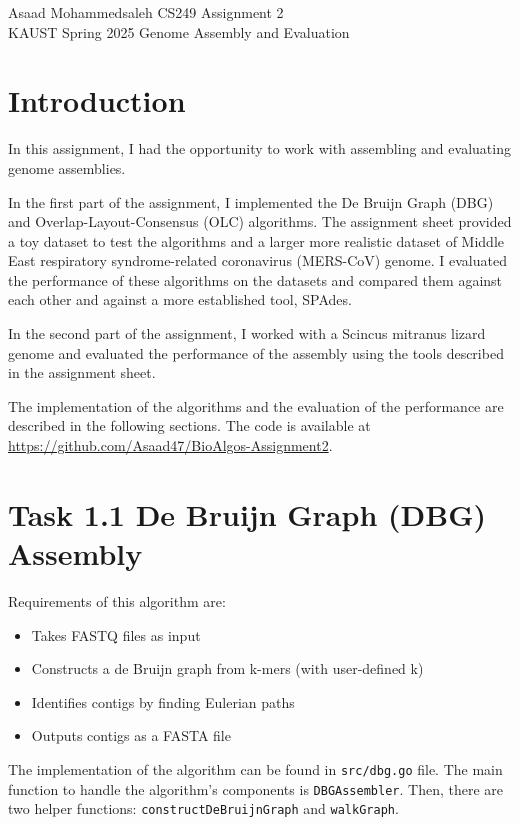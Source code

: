 \documentclass[12pt]{article}
\begin{document}
\noindent Asaad Mohammedsaleh \hfill CS249 Assignment 2\\
KAUST Spring 2025 \hfill Genome Assembly and Evaluation


\hrulefill

\section{Introduction}

In this assignment, I had the opportunity to work with assembling and evaluating genome assemblies. 

In the first part of the assignment, I implemented the De Bruijn Graph (DBG) and Overlap-Layout-Consensus (OLC) algorithms.
The assignment sheet provided a toy dataset to test the algorithms and a larger more realistic dataset of Middle East respiratory
syndrome-related coronavirus (MERS-CoV) genome. I evaluated the performance of these algorithms on the datasets and compared them against each other and against a more established tool, SPAdes.

In the second part of the assignment, I worked with a Scincus mitranus lizard genome and evaluated the performance of the assembly using the tools described in the assignment sheet. 

The implementation of the algorithms and the evaluation of the performance are described in the following sections. The code is available at \url{https://github.com/Asaad47/BioAlgos-Assignment2}.

\section{Task 1.1 De Bruijn Graph (DBG) Assembly}

Requirements of this algorithm are:
\begin{itemize}
    \item Takes FASTQ files as input
    \item Constructs a de Bruijn graph from k-mers (with user-defined k)
    \item Identifies contigs by finding Eulerian paths
    \item Outputs contigs as a FASTA file
\end{itemize}

The implementation of the algorithm can be found in \texttt{src/dbg.go} file. The main function to handle the algorithm's components is \texttt{DBGAssembler}.
Then, there are two helper functions: \texttt{constructDeBruijnGraph} and \texttt{walkGraph}.
\end{document}
